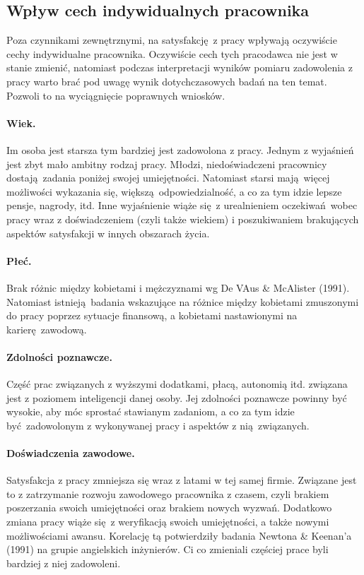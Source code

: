\subsection{Wpływ cech indywidualnych pracownika}
Poza czynnikami zewnętrznymi, na satysfakcję z pracy wpływają oczywiście cechy indywidualne pracownika. Oczywiście cech tych pracodawca nie jest w stanie zmienić, natomiast podczas interpretacji wyników pomiaru zadowolenia z pracy warto brać pod uwagę wynik dotychczasowych badań na ten temat. Pozwoli to na wyciągnięcie poprawnych wniosków.

\paragraph{Wiek.} Im osoba jest starsza tym bardziej jest zadowolona z pracy. Jednym z wyjaśnień jest zbyt mało ambitny rodzaj pracy. Młodzi, niedoświadczeni pracownicy dostają zadania poniżej swojej umiejętności. Natomiast starsi mają więcej możliwości wykazania się, większą odpowiedzialność, a co za tym idzie lepsze pensje, nagrody, itd. Inne wyjaśnienie wiąże się z urealnieniem oczekiwań wobec pracy wraz z doświadczeniem (czyli
także wiekiem) i poszukiwaniem brakujących aspektów satysfakcji w innych obszarach życia.
\paragraph{Płeć.} Brak różnic między kobietami i mężczyznami wg De VAus \& McAlister (1991). Natomiast istnieją badania wskazujące na różnice między kobietami zmuszonymi do pracy poprzez sytuacje finansową, a kobietami nastawionymi na karierę zawodową.
\paragraph{Zdolności poznawcze.} Część prac związanych z wyższymi dodatkami, płacą, autonomią itd. związana jest z poziomem inteligencji danej osoby. Jej zdolności poznawcze powinny być wysokie, aby móc sprostać stawianym zadaniom, a co za tym idzie być zadowolonym z wykonywanej pracy i aspektów z nią związanych.
\paragraph{Doświadczenia zawodowe.} Satysfakcja z pracy zmniejsza się wraz z latami w tej samej firmie. Związane jest to z zatrzymanie rozwoju zawodowego pracownika z czasem, czyli brakiem poszerzania swoich umiejętności oraz brakiem nowych wyzwań. Dodatkowo zmiana pracy wiąże się z weryfikacją swoich umiejętności, a także nowymi możliwościami awansu. Korelację tą potwierdziły badania Newtona \& Keenan'a (1991) na grupie angielskich inżynierów. Ci co zmieniali częściej prace byli bardziej z niej zadowoleni.
